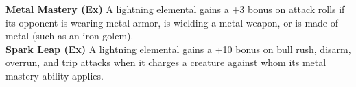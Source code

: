 \textbf{Metal Mastery (Ex)} A lightning elemental gains a +3 bonus
on attack rolls if its opponent is wearing metal armor, is wielding a metal weapon, or is made of metal (such as an iron golem). \\

\textbf{Spark Leap (Ex)} A lightning elemental gains a +10 bonus on bull rush, disarm, overrun, and trip attacks when it charges a creature against whom its metal mastery ability applies. \\

\newpage
